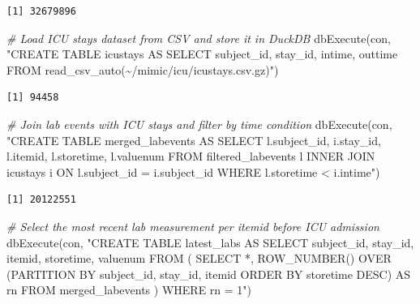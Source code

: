 \documentclass[
]{article}
\newenvironment{Shaded}{\begin{snugshade}}{\end{snugshade}}
\newcommand{\CommentTok}[1]{\textcolor[rgb]{0.56,0.35,0.01}{\textit{#1}}}
\newcommand{\FunctionTok}[1]{\textcolor[rgb]{0.00,0.00,0.00}{#1}}
\newcommand{\NormalTok}[1]{\textcolor[rgb]{0.00,0.00,0.00}{#1}}
\newcommand{\StringTok}[1]{\textcolor[rgb]{0.31,0.60,0.02}{#1}}
\begin{document}
\begin{verbatim}
[1] 32679896
\end{verbatim}

\begin{Shaded}
\begin{Highlighting}[]
\CommentTok{\#  Load ICU stays dataset from CSV and store it in DuckDB}
\FunctionTok{dbExecute}\NormalTok{(con, }\StringTok{"CREATE TABLE icustays AS }
\StringTok{                SELECT subject\_id, stay\_id, intime, outtime }
\StringTok{                FROM read\_csv\_auto(\textquotesingle{}\textasciitilde{}/mimic/icu/icustays.csv.gz\textquotesingle{})"}\NormalTok{)}
\end{Highlighting}
\end{Shaded}

\begin{verbatim}
[1] 94458
\end{verbatim}

\begin{Shaded}
\begin{Highlighting}[]
\CommentTok{\# Join lab events with ICU stays and filter by time condition}
\FunctionTok{dbExecute}\NormalTok{(con, }\StringTok{"CREATE TABLE merged\_labevents AS }
\StringTok{                SELECT l.subject\_id, i.stay\_id, }
\StringTok{                l.itemid, l.storetime, l.valuenum}
\StringTok{                FROM filtered\_labevents l}
\StringTok{                INNER JOIN icustays i ON l.subject\_id = i.subject\_id}
\StringTok{                WHERE l.storetime \textless{} i.intime"}\NormalTok{)}
\end{Highlighting}
\end{Shaded}

\begin{verbatim}
[1] 20122551
\end{verbatim}

\begin{Shaded}
\begin{Highlighting}[]
\CommentTok{\# Select the most recent lab measurement per \textasciigrave{}itemid\textasciigrave{} before ICU admission}
\FunctionTok{dbExecute}\NormalTok{(con, }\StringTok{"CREATE TABLE latest\_labs AS }
\StringTok{                SELECT subject\_id, stay\_id, itemid, storetime, valuenum}
\StringTok{                FROM (}
\StringTok{                    SELECT *, ROW\_NUMBER() OVER (PARTITION BY }
\StringTok{                    subject\_id, stay\_id, itemid ORDER BY storetime DESC) AS rn}
\StringTok{                    FROM merged\_labevents}
\StringTok{                ) WHERE rn = 1"}\NormalTok{)}
\end{Highlighting}
\end{Shaded}
\end{document}
